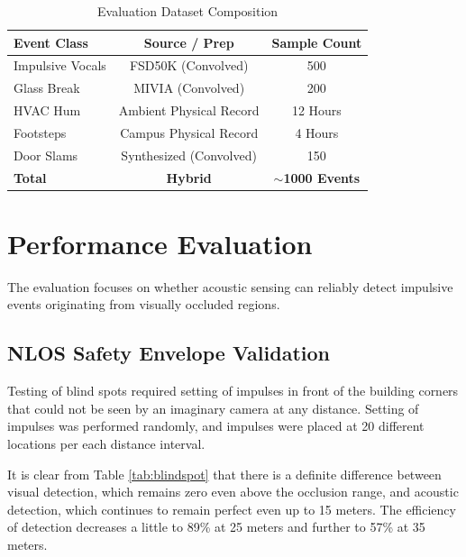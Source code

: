 \documentclass[conference]{IEEEtran}
\begin{document}
\begin{table}[htbp]
\caption{Evaluation Dataset Composition}
\begin{center}
\begin{tabular}{lcc}
\toprule
\textbf{Event Class} & \textbf{Source / Prep} & \textbf{Sample Count} \\
\midrule
Impulsive Vocals & FSD50K (Convolved) & 500 \\
Glass Break & MIVIA (Convolved) & 200 \\
HVAC Hum & Ambient Physical Record & 12 Hours \\
Footsteps & Campus Physical Record & 4 Hours \\
Door Slams & Synthesized (Convolved) & 150 \\
\textbf{Total} & \textbf{Hybrid} & \textbf{$\sim$1000 Events} \\
\bottomrule
\end{tabular}
\end{center}
\label{tab:dataset}
\end{table}

\section{Performance Evaluation}

The evaluation focuses on whether acoustic sensing can reliably detect impulsive events originating from visually occluded regions.

\subsection{NLOS Safety Envelope Validation}
Testing of blind spots required setting of impulses in front of the building corners that could not be seen by an imaginary camera at any distance. Setting of impulses was performed randomly, and impulses were placed at 20 different locations per each distance interval.

It is clear from Table \ref{tab:blindspot} that there is a definite difference between visual detection, which remains zero even above the occlusion range, and acoustic detection, which continues to remain perfect even up to 15 meters. The efficiency of detection decreases a little to 89\% at 25 meters and further to 57\% at 35 meters.
\end{document}
